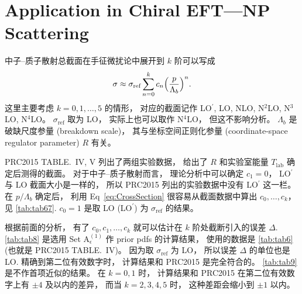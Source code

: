 
\section{Application in Chiral EFT---NP Scattering}

中子--质子散射总截面在手征微扰论中展开到 $k$ 阶可以写成
\begin{equation}
  \label{eq:CrossSection}
\sigma \approx \sigma_{\textrm{ref}}\sum_{n=0}^k c_n
\Bigl( \frac{p}{\Lambda_b} \Bigr)^n.
\end{equation}
这里主要考虑 $k=0,1,\ldots,5$ 的情形，
对应的截面记作 LO${}^\prime$, LO, NLO, N${}^2$LO, N${}^3$LO, N${}^4$LO。
$\sigma_{\textrm{ref}}$ 取为 LO，
实际上也可以取作 N${}^4$LO，
但这不影响分析。
$\Lambda_b$ 是破缺尺度参量 (breakdown scale)，
其与坐标空间正则化参量 (coordinate-space regulator parameter) $R$ 有关。

PRC2015 TABLE.~IV, V 列出了两组实验数据，
给出了 $R$ 和实验室能量 $T_{\textrm{lab}}$ 确定后测得的截面。
对于中子--质子散射而言，
理论分析中可以确定 $c_1=0$，
LO${}^\prime$ 与 LO 截面大小是一样的，
所以 PRC2015 列出的实验数据中没有 LO${}^\prime$ 这一栏。
在 $p/\Lambda_b$ 确定后，
利用 Eq~\eqref{eq:CrossSection} 很容易从截面数据中算出 $c_0,\ldots, c_k$，
见 \autoref{tab:tab67}.
$c_0=1$ 是取 LO (LO${}^\prime$) 为 $\sigma_{\textrm{ref}}$ 的结果。

根据前面的分析，
有了 $c_0,c_1,\ldots,c_k$ 就可以估计在 $k$ 阶处截断引入的误差 $\Delta$.
\autoref{tab:tab8} 是选用 Set A${}_{\epsilon}^{(1)}$ 作 prior pdfs 的计算结果，
使用的数据是 \autoref{tab:tab6} (也就是 PRC2015 TABLE.~IV)。
因为取 $\sigma_{\textrm{ref}}$ 为 LO，
所以误差 $\Delta$ 的单位也是 LO.
精确到第二位有效数字时，
计算结果和 PRC2015 是完全符合的。
\autoref{tab:tab9} 是不作首项近似的结果。
在 $k=0,1$ 时，
计算结果和 PRC2015 在第二位有效数字上有 $\pm4$ 及以内的差异，
而当 $k=2,3,4,5$ 时，
这种差距会缩小到 $\pm1$ 以内。
